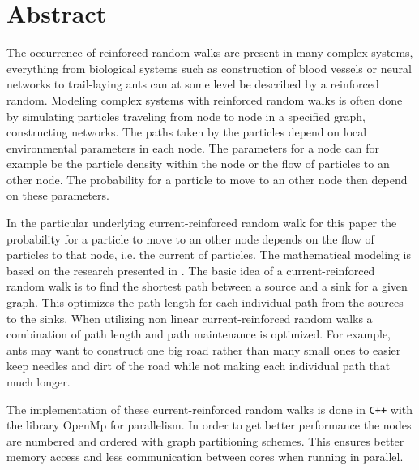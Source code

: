 \section{Abstract}
\label{sec:abstract}

The occurrence of reinforced random walks are present in many complex systems, everything from biological systems such as construction of blood vessels or neural networks to trail-laying ants can at some level be described by a reinforced random. Modeling complex systems with reinforced random walks is often done by simulating particles traveling from node to node in a specified graph, constructing networks. The paths taken by the particles depend on local environmental parameters in each node. The parameters for a node can for example be the particle density within the node or the flow of particles to an other node. The probability for a particle to move to an other node then depend on these parameters.

In the particular underlying current-reinforced random walk for this paper the probability for a particle to move to an other node depends on the flow of particles to that node, i.e. the current of particles. The mathematical modeling is based on the research presented in \cite{Sumpter}. The basic idea of a current-reinforced random walk is to find the shortest path between a source and a sink for a given graph. This optimizes the path length for each individual path from the sources to the sinks. When utilizing non linear current-reinforced random walks a combination of path length and path maintenance is optimized. For example, ants may want to construct one big road rather than many small ones to easier keep needles and dirt of the road while not making each individual path that much longer.


The implementation of these current-reinforced random walks is done in \texttt{C++} with the library OpenMp for parallelism. In order to get better performance the nodes are numbered and ordered with graph partitioning schemes. This ensures better memory access and less communication between cores when running in parallel. 